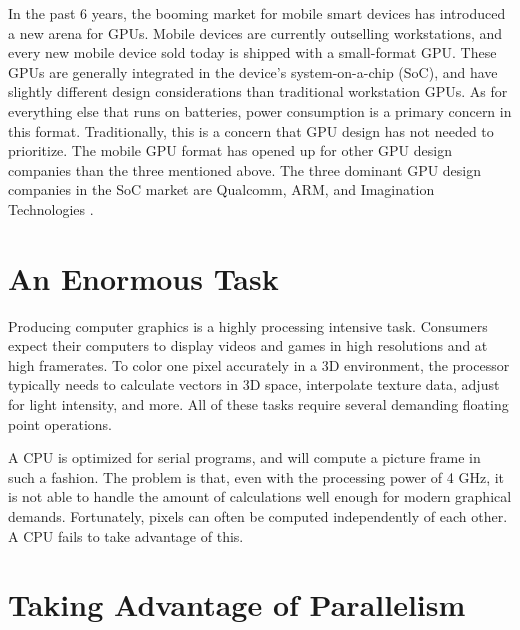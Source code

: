 \documentclass[../main/report.tex]{subfiles}
\begin{document}
In the past 6 years, the booming market for mobile smart devices has introduced a new arena for GPUs.
Mobile devices are currently outselling workstations, and every new mobile device sold today is shipped with a small-format GPU.
These GPUs are generally integrated in the device's system-on-a-chip (SoC), and have slightly different design considerations than traditional workstation GPUs.
As for everything else that runs on batteries, power consumption is a primary concern in this format.
Traditionally, this is a concern that GPU design has not needed to prioritize.
The mobile GPU format has opened up for other GPU design companies than the three mentioned above.
The three dominant GPU design companies in the SoC market are Qualcomm, ARM, and Imagination Technologies \cite{gpu_mobile_sales}.


\section{An Enormous Task}

Producing computer graphics is a highly processing intensive task.
Consumers expect their computers to display videos and games in high resolutions and at high framerates.
To color one pixel accurately in a 3D environment, the processor typically needs to calculate vectors in 3D space, interpolate texture data, adjust for light intensity, and more.
All of these tasks require several demanding floating point operations.

A CPU is optimized for serial programs, and will compute a picture frame in such a fashion.
The problem is that, even with the processing power of 4 GHz, it is not able to handle the amount of calculations well enough for modern graphical demands.
Fortunately, pixels can often be computed independently of each other.
A CPU fails to take advantage of this.

\section{Taking Advantage of Parallelism}
\end{document}
